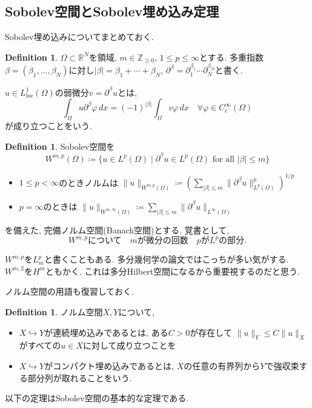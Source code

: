 \documentclass[dvipdfmx,a4paper,11pt]{article} %
\theoremstyle{definition}
\newtheorem{defn}[thm]{Definition}
\theoremstyle{remark}
\numberwithin{equation}{section}
\begin{document}
\subsection{Sobolev空間とSobolev埋め込み定理}


Sobolev埋め込みについてまとめておく. 

\begin{defn}
\(\Omega\subset \mathbb{R}^N\)を領域, \(m\in\mathbb{Z}_{\geq 0}\), \(1\leq p\leq\infty\)とする. 多重指数\(\beta=(\beta_1,\ldots,\beta_N)\)に対し\(\lvert\beta\rvert=\beta_1+\cdots+\beta_N\), \(\partial^{\beta}=\partial_1^{\beta_1}\cdots\partial_N^{\beta_N}\)と書く. 

\(u\in L^1_{\mathrm{loc}}(\Omega)\)の弱微分\(v=\partial^{\beta} u\)とは,
\[
\int_\Omega u\partial^{\beta}\varphi\,dx=(-1)^{\lvert\beta\rvert}\int_\Omega v\varphi\,dx
\quad
\forall \varphi\in C_c^\infty(\Omega)
\]
が成り立つことをいう.
\end{defn}

\begin{defn} 
Sobolev空間を
\[
W^{m,p}(\Omega)\coloneqq \{u\in L^p(\Omega)\mid \partial^{\beta} u\in L^p(\Omega)\text{ for all }\lvert\beta\rvert\leq m\}
\]
\begin{itemize}
\item  \(1\leq p<\infty\)のときノルムは
\(
\lVert u\rVert_{W^{m,p}(\Omega)}\coloneqq \left(\sum_{\lvert\beta\rvert\leq m}\lVert \partial^{\beta} u\rVert_{L^p(\Omega)}^p\right)^{1/p}
\)
\item  \(p=\infty\)のときは
\(
\lVert u\rVert_{W^{m,\infty}(\Omega)}\coloneqq \sum_{\lvert\beta\rvert\leq m}\lVert \partial^{\beta} u\rVert_{L^\infty(\Omega)}
\)
\end{itemize}
を備えた, 完備ノルム空間(Banach空間)とする. 
覚書として, 
\[
W^{m,p} \text{について}
\quad \text{$m$が微分の回数}
\quad \text{$p$が$L^p$の部分.}
\]
\end{defn}
$W^{m, p}$を$L^{p}_{m}$と書くこともある. 多分幾何学の論文ではこっちが多い気がする.
$W^{m,2}$を$H^{m}$ともかく. これは多分Hilbert空間になるから重要視するのだと思う. 

ノルム空間の用語も復習しておく.
\begin{defn}
\label{defn-norm-cpt}
ノルム空間\(X,Y\)について, 
\begin{itemize}
\item \(X\hookrightarrow Y\)が連続埋め込みであるとは, ある\(C>0\)が存在して
\(\lVert u\rVert_Y\leq C\lVert u\rVert_X
\)
がすべての\(u\in X\)に対して成り立つことを 
\item  \(X\hookrightarrow Y\)がコンパクト埋め込みであるとは, \(X\)の任意の有界列から\(Y\)で強収束する部分列が取れることをいう.
\end{itemize}
\end{defn}
以下の定理はSobolev空間の基本的な定理である. 
\end{document}
